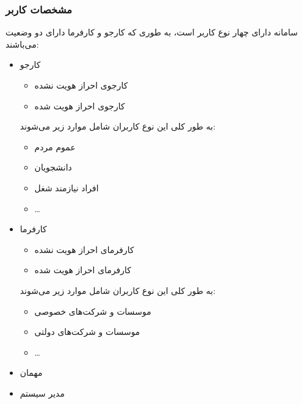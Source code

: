 \documentclass[12pt]{article}
\begin{document}
	\subsubsection{مشخصات کاربر}
	سامانه دارای چهار نوع کاربر است، به طوری که کارجو و کارفرما دارای دو وضعیت می‌باشند:
	\begin{itemize}
		\item
		کارجو
		\begin{itemize}
			\item
			کارجوی احراز‌ هویت نشده
			\item
			کارجوی احراز‌ هویت شده
		\end{itemize}
		به طور کلی این نوع کاربران شامل موارد زیر می‌شوند:
		\begin{itemize}
			\item
			عموم مردم
			\item
			دانشجویان
			\item
			افراد نیازمند شغل
			\item
			…
		\end{itemize}
		\item
		کارفرما
		\begin{itemize}
			\item
			کارفرمای احراز‌ هویت نشده
			\item
			کارفرمای احراز‌ هویت شده
		\end{itemize}
		به طور کلی این نوع کاربران شامل موارد زیر می‌شوند:

		\begin{itemize}
			\item
			موسسات و شرکت‌های خصوصی
			\item
			موسسات و شرکت‌های دولتی
			\item
			…
		\end{itemize}
		\item
		مهمان
		\item
		مدیر سیستم
	\end{itemize}
\end{document}
